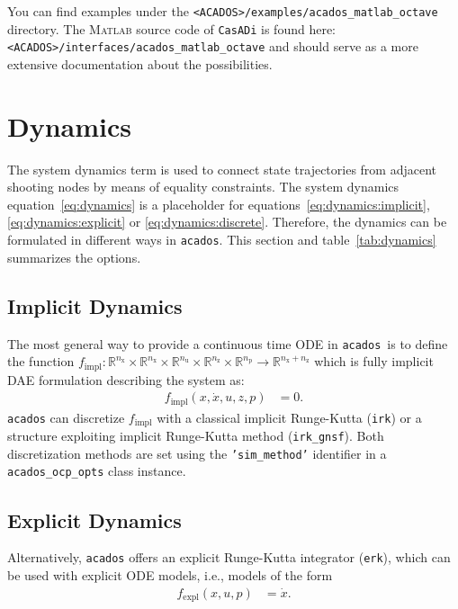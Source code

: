 \documentclass[english]{article}
\newcommand{\code}[1]{\texttt{#1}}
\newcommand{\casadi}{\texttt{CasADi}}
\newcommand{\acados}{\texttt{acados}}
\newcommand{\matlab}{\textsc{Matlab}}
\newcommand{\ind}[1]{_{\textrm{#1}}}
\newcommand{\nx}{n\ind{x}}
\newcommand{\nuu}{n\ind{u}}
\newcommand{\nz}{n\ind{z}}
\newcommand{\np}{n\ind{p}}
\begin{document}
You can find examples under the \code{<ACADOS>/examples/acados\_matlab\_octave} directory.
The \matlab{} source code of \casadi{} is found here: \code{<ACADOS>/interfaces/acados\_matlab\_octave} and should serve as a more extensive documentation about the possibilities.
%
\section{Dynamics}\label{sec:dynamics}
%
The system dynamics term is used to connect state trajectories from adjacent shooting nodes by means of equality constraints.
%
The system dynamics equation~\eqref{eq:dynamics} is a placeholder for equations~\eqref{eq:dynamics:implicit}, \eqref{eq:dynamics:explicit} or \eqref{eq:dynamics:discrete}. Therefore, the dynamics can be formulated in different ways in \acados. This section and table~\ref{tab:dynamics} summarizes the options.
%
\subsection{Implicit Dynamics}\label{sec:dynamics:implicit}
%
The most general way to provide a continuous time ODE in \acados\ is to define the function $ f\ind{impl}: \mathbb{R}^{\nx}\times\mathbb{R}^{\nx}\times\mathbb{R}^{\nuu}\times\mathbb{R}^{\nz}\times\mathbb{R}^{\np} \rightarrow \mathbb{R}^{\nx+\nz}$ which is fully implicit DAE formulation describing the system as:
\begin{align}
    f\ind{impl}(x, \dot{x}, u, z, p) &= 0.\label{eq:dynamics:implicit}
\end{align}
\acados{} can discretize $ f\ind{impl} $ with a classical implicit Runge-Kutta (\code{irk}) or a structure exploiting implicit Runge-Kutta method (\code{irk\_gnsf}). Both discretization methods are set using the \code{'sim\_method'} identifier in a \code{acados\_ocp\_opts} class instance.
%
\subsection{Explicit Dynamics}\label{sec:dynamics:explicit}
%
Alternatively, \acados{} offers an explicit Runge-Kutta integrator (\code{erk}), which can be used with explicit ODE models, i.e., models of the form
\begin{align}
f\ind{expl}(x,u,p) &= \dot{x}.\label{eq:dynamics:explicit}
\end{align}
%
\end{document}
